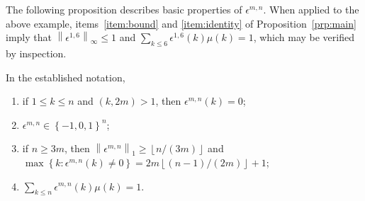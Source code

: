 \documentclass[12pt,reqno]{article}
\newcommand\floor[1]{\left\lfloor#1\right\rfloor}
\newcommand{\norm}[1]{\ensuremath{\left\|{#1}\right\|}}
\newcommand{\set}[1]{\ensuremath{\left\{{#1}\right\}}}
\begin{document}
The following proposition describes basic properties of  $\epsilon^{m,n}$.
When applied to the above example, items~\ref{item:bound} and \ref{item:identity} of Proposition~\ref{prp:main}
imply that $\norm{\epsilon^{1,6}}_{\infty}\leq 1$ and $\sum_{k\leq 6}\epsilon^{1,6}(k)\mu(k)=1$, which may be 
verified by inspection.
\begin{proposition}
In the established notation, 
\begin{enumerate}
\item \label{prp:gcd}if $1\leq k \leq n$ and $(k,2m)>1$, then $\epsilon^{m,n}(k)=0$;
\item \label{item:bound}$\epsilon^{m,n}\in\set{-1,0,1}^{n}$;
\item if $n\geq 3m$, then $\norm{\epsilon^{m,n}}_{1}\geq\floor{n/(3m)}$ and {$\max\!\set{k\!:\!\epsilon^{m,n}(k)\neq 0}\!=2m\!\floor{(n-1)/(2m)}\!+\!1$};\label{item:vanish}
\item \label{item:identity}$\sum_{k\leq n} \epsilon^{m,n}(k)\mu(k)=1$.
\end{enumerate}
\label{prp:main}
\end{proposition}
\end{document}
